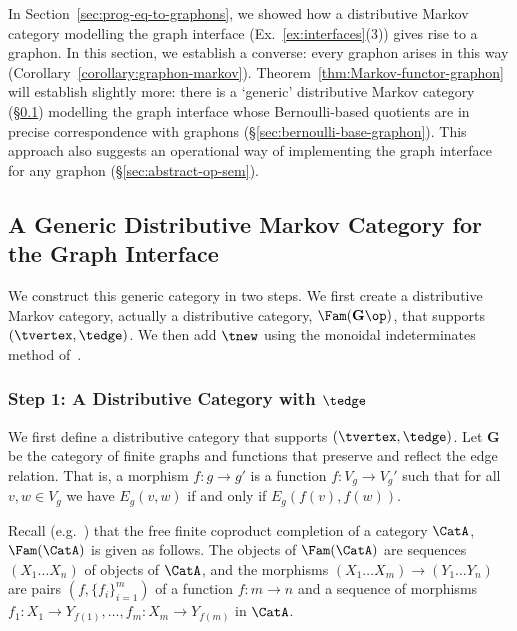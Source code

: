 \newcommand{\CatCLG}{\mathbf{RGM}}
\newcommand{\Inj}{\mathbf{FinSetInj}}\label{sec:rgm-cat}
\newcommand{\Nat}{\mathrm{Nat}}

In Section~\ref{sec:prog-eq-to-graphons}, we showed how a distributive Markov category modelling the graph interface (Ex.~\ref{ex:interfaces}(3)) gives rise to a graphon.
In this section, we establish a converse: every graphon arises in this
way (Corollary~\ref{corollary:graphon-markov}). 
Theorem~\ref{thm:Markov-functor-graphon} will establish slightly more:
there is a `generic' distributive Markov category
(\S\ref{sec:generic-dmc}) modelling the graph interface whose
Bernoulli-based quotients are in precise correspondence with graphons
(\S\ref{sec:bernoulli-base-graphon}). This approach also suggests an
operational way of implementing the graph interface for any graphon (\S\ref{sec:abstract-op-sem}).

\subsection{A Generic Distributive Markov Category for the Graph Interface}
\label{sec:generic-dmc}
\newcommand{\CatG}{\mathbf{G}}
\newcommand{\GenericM}{\mathcal{T}}


We construct this generic category in two steps. We first create a distributive Markov category, actually a
distributive category, $\Fam(\CatG\op)$, that supports $(\tvertex,\tedge)$. We then add
$\tnew$ using the monoidal indeterminates method
of~\cite{hermida-tennent}.

\subsubsection{Step 1: A Distributive Category with $\tedge$}\label{sec:edge-cat}
\newcommand{\vertices}[1]{V_{#1}}
\newcommand{\edges}[1]{E_{#1}}

We first define a distributive category that supports
$(\tvertex,\tedge)$.
Let $\CatG$ be the category of finite graphs and functions that
preserve and reflect the edge relation. That is, a morphism $f:g\to
g'$ is a function $f:\vertices g \to \vertices g'$ such that for all
$v,w\in \vertices g$ we have $\edges g(v,w)$ if and only if $\edges
g(f(v),f(w))$. 

Recall (e.g.~\cite{hu-tholen}) that the free finite coproduct completion of a category
$\CatA$, $\Fam(\CatA)$ is given as follows. The objects of
$\Fam(\CatA)$ are sequences
$(X_1\dots X_n)$ of objects of $\CatA$, and the morphisms
$(X_1\dots X_m)\to (Y_1\dots Y_n)$ are pairs $(f,\{f_i\}_{i=1}^m)$
of a function $f:m\to n$ and a sequence of morphisms ${f_1:X_{1}\to Y_{f(1)}},\dots, {f_m:X_{m} \to
Y_{f(m)}}$ in $\CatA$.  

